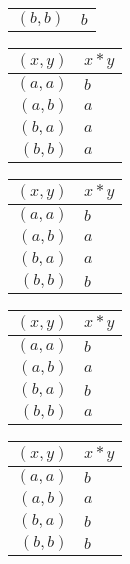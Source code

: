 \begin{enumerate}[label={\Alph*.},font={\bfseries}]
\begin{enumerate}[label={\arabic*},font={\bfseries}]
\begin{minipage}[h]{.25\textwidth}
\begin{tabular}{ r | l }
            $(b,b)$ & $b$
          \end{tabular}
        \end{minipage}
        \begin{minipage}[h]{.25\textwidth}
          \begin{tabular}{ r | l }
            $(x,y)$ & $x*y$ \\
            \hline
            $(a,a)$ & $b$ \\
            $(a,b)$ & $a$ \\
            $(b,a)$ & $a$ \\
            $(b,b)$ & $a$
          \end{tabular}
        \end{minipage}
        \begin{minipage}[h]{.25\textwidth}
          \begin{tabular}{ r | l }
            $(x,y)$ & $x*y$ \\
            \hline
            $(a,a)$ & $b$ \\
            $(a,b)$ & $a$ \\
            $(b,a)$ & $a$ \\
            $(b,b)$ & $b$
          \end{tabular}
        \end{minipage}
        \begin{minipage}[h]{.25\textwidth}
          \begin{tabular}{ r | l }
            $(x,y)$ & $x*y$ \\
            \hline
            $(a,a)$ & $b$ \\
            $(a,b)$ & $a$ \\
            $(b,a)$ & $b$ \\
            $(b,b)$ & $a$
          \end{tabular}
        \end{minipage}
        \begin{minipage}[h]{.25\textwidth}
          \begin{tabular}{ r | l }
            $(x,y)$ & $x*y$ \\
            \hline
            $(a,a)$ & $b$ \\
            $(a,b)$ & $a$ \\
            $(b,a)$ & $b$ \\
            $(b,b)$ & $b$

\end{tabular}
\end{minipage}
\end{enumerate}
\end{enumerate}
